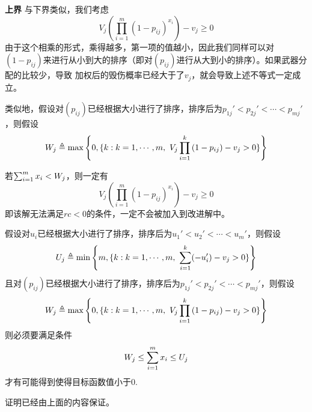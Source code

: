 \textbf{上界}
与下界类似，我们考虑
\begin{equation*}
    V_j \left( \prod_{i=1}^m (1 - p_{ij}) ^ {x_{i}}  \right) - v_j \geq 0
\end{equation*}
由于这个相乘的形式，乘得越多，第一项的值越小，因此我们同样可以对$(1 - p_{ij})$来进行从小到大的排序（即对$(p_{ij})$进行从大到小的排序）。如果武器分配的比较少，导致
加权后的毁伤概率已经大于了$v_j$，就会导致上述不等式一定成立。

类似地，假设对$(p_{ij})$已经根据大小进行了排序，排序后为$p_{1j}' < p_{2j}' < \cdots < p_{mj}'$，则假设
\begin{equation*}
    W_j \triangleq \max \left\{ 0, \{k:k = 1, \cdots, m,\ V_j\prod_{i=1}^{k}{(1 - p_{ij})} - v_j > 0 \}\right\}
\end{equation*}

若$\sum_{i=1}^{m} x_i < W_j$，则一定有
\begin{equation*}
    V_j \left( \prod_{i=1}^m (1 - p_{ij}) ^ {x_{i}}  \right) - v_j \geq 0
\end{equation*}
即该解无法满足$rc < 0$的条件，一定不会被加入到改进解中。

\begin{proposition}
    假设对$u_i$已经根据大小进行了排序，排序后为$u_1' < u_2' < \cdots < u_m'$，则假设
    \begin{equation*}
        U_j \triangleq \min \left\{ m, \{k:k = 1, \cdots, m,\ \sum_{i=1}^{k} (-u_i') - v_j > 0 \}\right\}
    \end{equation*}
    且对$(p_{ij})$已经根据大小进行了排序，排序后为$p_{1j}' < p_{2j}' < \cdots < p_{mj}'$，则假设
    \begin{equation*}
        W_j \triangleq \max \left\{ 0, \{k:k = 1, \cdots, m,\ V_j\prod_{i=1}^{k}{(1 - p_{ij})} - v_j > 0 \}\right\}
    \end{equation*}
    则必须要满足条件
    \begin{equation*}
        W_j \leq \sum_{i=1}^{m} x_i \leq U_j
    \end{equation*}
    才有可能得到使得目标函数值小于0.
\end{proposition}
证明已经由上面的内容保证。

